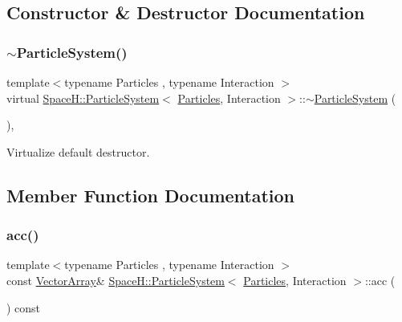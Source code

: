 \subsection{Constructor \& Destructor Documentation}
\mbox{\label{class_space_h_1_1_particle_system_a897e72dbf619c8a235121e195bc7edde}} 
\subsubsection{\texorpdfstring{$\sim$\+Particle\+System()}{~ParticleSystem()}}
{\footnotesize\ttfamily template$<$typename Particles , typename Interaction $>$ \\
virtual \mbox{\hyperlink{class_space_h_1_1_particle_system}{Space\+H\+::\+Particle\+System}}$<$ \mbox{\hyperlink{struct_space_h_1_1_particles}{Particles}}, Interaction $>$\+::$\sim$\mbox{\hyperlink{class_space_h_1_1_particle_system}{Particle\+System}} (\begin{DoxyParamCaption}{ }\end{DoxyParamCaption})\hspace{0.3cm}{\ttfamily [inline]}, {\ttfamily [virtual]}}



Virtualize default destructor. 



\subsection{Member Function Documentation}
\mbox{\label{class_space_h_1_1_particle_system_a9c7f70968a15d3d02248b313b086b21d}} 
\subsubsection{\texorpdfstring{acc()}{acc()}\hspace{0.1cm}{\footnotesize\ttfamily [1/2]}}
{\footnotesize\ttfamily template$<$typename Particles , typename Interaction $>$ \\
const \mbox{\hyperlink{class_space_h_1_1_particle_system_acf48c66c8d42b85cd3a77911bb7da9ce}{Vector\+Array}}\& \mbox{\hyperlink{class_space_h_1_1_particle_system}{Space\+H\+::\+Particle\+System}}$<$ \mbox{\hyperlink{struct_space_h_1_1_particles}{Particles}}, Interaction $>$\+::acc (\begin{DoxyParamCaption}{ }\end{DoxyParamCaption}) const\hspace{0.3cm}{\ttfamily [inline]}}



